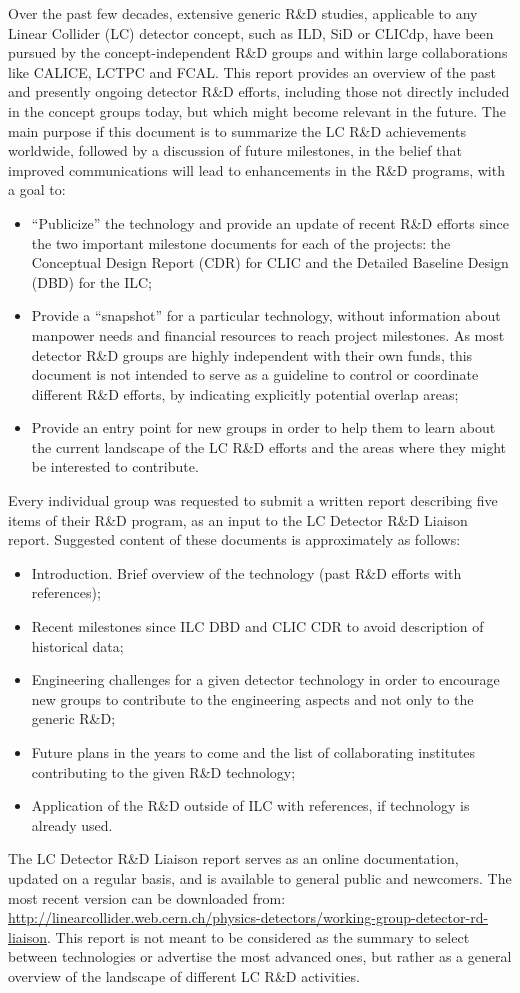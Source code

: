 \documentclass[10pt,final]{report}
\begin{document}
Over the past few decades, extensive generic R\&D studies, applicable to any Linear Collider (LC) detector concept, such as ILD, SiD or CLICdp, have been pursued by the concept-independent R\&D groups and within large collaborations like CALICE, LCTPC and FCAL. This report provides an overview of the past and presently ongoing detector R\&D efforts, including those not directly included in the concept groups today, but which might become relevant in the future. The main purpose if this document is to summarize the LC R\&D achievements worldwide, followed by a discussion of future milestones, in the belief that improved communications will lead to enhancements in the R\&D programs, with a goal to:
\begin{itemize}
\item “Publicize” the technology and provide an update of recent R\&D efforts since the two important milestone documents for each of the projects: the Conceptual Design Report (CDR) for CLIC and the Detailed Baseline Design (DBD) for the ILC;
\item Provide a “snapshot” for a particular technology, without information about manpower needs and financial resources to reach project milestones. As most detector R\&D groups are highly independent with their own funds, this document is not intended to serve as a guideline to control or coordinate different R\&D efforts, by indicating explicitly potential overlap areas;
\item Provide an entry point for new groups in order to help them to learn about the current landscape of the LC R\&D efforts and the areas where they might be interested to contribute.
\end{itemize}
Every individual group was requested to submit a written report describing five items of their R\&D program, as an input to the LC Detector R\&D Liaison report. Suggested content of these documents is approximately as follows:
\begin{itemize}
\item Introduction. Brief overview of the technology (past R\&D efforts with references);
\item Recent milestones since ILC DBD and CLIC CDR to avoid description of historical data;
\item Engineering challenges for a given detector technology in order to encourage new groups to contribute to the engineering aspects and not only to the generic R\&D;
\item Future plans in the years to come and the list of collaborating institutes contributing to the given R\&D technology;
\item Application of the R\&D outside of ILC with references, if technology is already used.
\end{itemize}
The LC Detector R\&D Liaison report serves as an online documentation, updated on a regular basis, and is available to general public and newcomers. The most recent version can be downloaded from: \url{http://linearcollider.web.cern.ch/physics-detectors/working-group-detector-rd-liaison}. This report is not meant to be considered as the summary to select between technologies or advertise the most advanced ones, but rather as a general overview of the landscape of different LC R\&D activities. 
\end{document}
